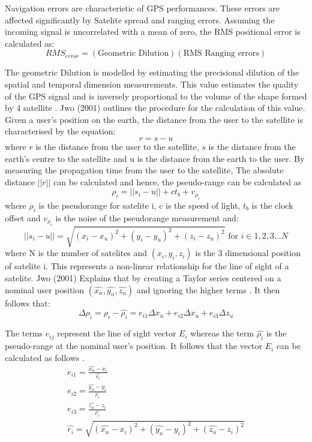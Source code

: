 Navigation errors are characteristic of GPS performances. These errors are affected significantly by Satelite spread and ranging errors. Assuming the incoming signal is uncorrelated with a mean of zero, the RMS positional error is calculated as:
\begin{equation}
	RMS_{error} = (\text{Geometric Dilution})(\text{RMS Ranging errors})
\end{equation}

The geometric Dilution is modelled by estimating the precisional dilution of the spatial and temporal dimension measurements. This value estimates the quality of the GPS signal and is inversely proportional to the volume of the shape formed by 4 satellite \cite{jwo2001efficient}. Jwo (2001) outlines the procedure for the calculation of this value. Given a user's position on the earth, the distance from the user to the satellite is characterised by the equation:
\begin{equation}
	r =  s - u
\end{equation}
where $r$ is the distance from the user to the satellite, $s$ is the distance from the earth's centre to the satellite and u is the distance from the earth to the user. By measuring the propagation time from the user to the satellite, The absolute distance $||r||$ can be calculated and hence, the pseudo-range can be calculated as
\begin{equation}
	\rho_i = ||s_i-u||+ct_b + v_{\rho_i}
\end{equation}
where $\rho_i$ is the pseudorange for satelite i, c is the speed of light, $t_b$ is  the clock offset and $v_{\rho_i}$ is the noise of the pseudorange measurement and:
\begin{equation}
	||s_i-u|| = \sqrt{(x_i - x_u)^2+(y_i-y_u)^2+(z_i-z_u)^2} \text{ for } i \in 1,2,3...N \label{los}
\end{equation}
where N is the number of satelites and $(x_i,y_i,z_i)$ is the 3 dimensional position of satelite i. This represents a non-linear relationship for the line of sight of a satelite.  Jwo (2001) Explains that by creating a Taylor series centered on a nominal user position $(\hat{x_n},\hat{y_n},\hat{z_n})$ and ignoring the higher terms \cite{jwo2001efficient}. It then follows that:
\begin{equation}
	\Delta\rho_i = \rho_i - \hat{\rho_i} = e_{i1}\Delta x_u + e_{i2}\Delta x_u +  e_{i3}\Delta z_u
\end{equation}

The terms $e_{ij}$ represent the line of sight vector $E_i$ whereas the term $\hat{\rho_i}$ is the pseudo-range at the nominal user's position. It follows that the vector $E_i$ can be calculated as follows \cite{jwo2001efficient}.
\begin{subequations}
	\begin{align}
		e_{i1} = \frac{\hat{x_n} - x_i}{\hat{r_i}}\\
		e_{i2} = \frac{\hat{y_n} - y_i}{\hat{r_i}}\\
		e_{i3} = \frac{\hat{z_n} - z_i}{\hat{r_i}}\\
		\hat{r_i} = \sqrt{(\hat{x_n} - x_i)^2+(\hat{y_n} -y_i)^2+(\hat{z_n} -z_i)^2}
	\end{align}
\end{subequations}

